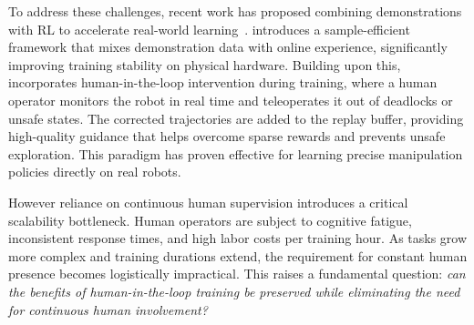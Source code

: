 \documentclass[runningheads]{llncs}
\begin{document}
To address these challenges, recent work has proposed combining demonstrations 
with RL to accelerate real-world learning~\cite{vecerik2017leveraging,rajeswaran2017learning,nair2018overcoming}. 
\cite{luo2024serl} introduces a sample-efficient framework that mixes demonstration data with online experience, significantly improving training stability on physical hardware. Building upon this, \cite{luo2025precise} incorporates human-in-the-loop intervention during training, where a human operator monitors the robot in real time and teleoperates it out of deadlocks or unsafe states. The corrected trajectories are added to the replay buffer, providing high-quality guidance that helps overcome sparse rewards and prevents 
unsafe exploration. This paradigm has proven effective for learning precise manipulation policies directly on real robots.


However reliance on continuous human supervision introduces a critical scalability bottleneck. Human operators are subject to cognitive fatigue, inconsistent response times, and high labor costs per training hour. As tasks grow more complex and training durations extend, the requirement for constant human presence becomes logistically impractical. This raises a fundamental question: \textit{can the benefits of human-in-the-loop training be preserved while eliminating the need for continuous human involvement?}
\end{document}
